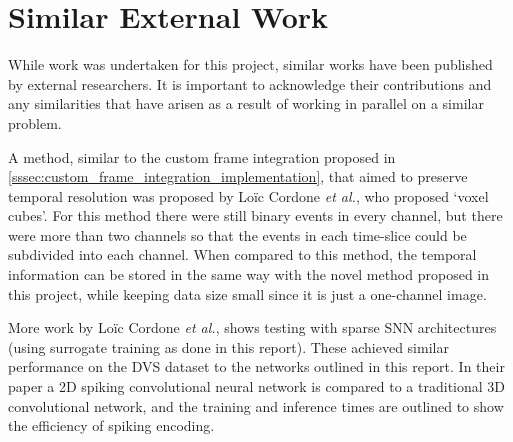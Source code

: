 \section{Similar External Work}

While work was undertaken for this project, similar works have been published by external researchers. It is important to acknowledge their contributions and any similarities that have arisen as a result of working in parallel on a similar problem.

A method, similar to the custom frame integration proposed in \cref{sssec:custom_frame_integration_implementation}, that aimed to preserve temporal resolution was proposed by Lo\"ic Cordone \textit{et al.}, who proposed `voxel cubes'\cite{MiniVovelCubes}. For this method there were still binary events in every channel, but there were more than two channels so that the events in each time-slice could be subdivided into each channel. When compared to this method, the temporal information can be stored in the same way with the novel method proposed in this project, while keeping data size small since it is just a one-channel image. 

More work by Lo\"ic Cordone \textit{et al.}\cite{OtherSnnWork}, shows testing with sparse SNN architectures (using surrogate training as done in this report). These achieved similar performance on the DVS dataset to the networks outlined in this report. In their paper a 2D spiking convolutional neural network is compared to a traditional 3D convolutional network, and the training and inference times are outlined to show the efficiency of spiking encoding.
